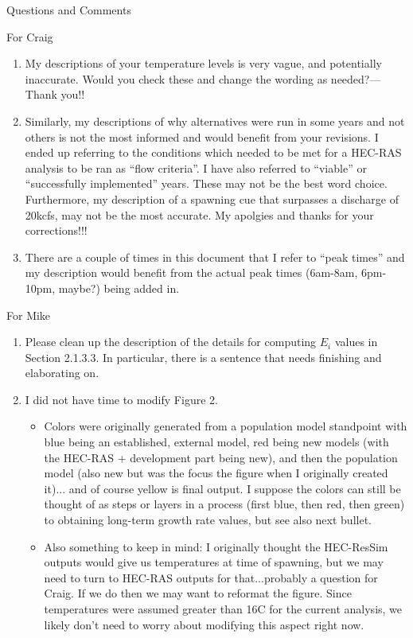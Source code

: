 \documentclass[12pt]{article}
\begin{document}
\begin{section}{Questions and Comments}
\begin{subsection}{For Craig}
\begin{enumerate}
\begin{itemize}
	\end{itemize}
\item My descriptions of your temperature levels is very vague, and potentially inaccurate.  Would you check these and change the wording as needed?---Thank you!!
\item Similarly, my descriptions of why alternatives were run in some years and not others is not the most informed and would benefit from your revisions.  I ended up referring to the conditions which needed to be met for a HEC-RAS analysis to be ran as ``flow criteria''.  I have also referred to ``viable'' or ``successfully implemented'' years.  These may not be the best word choice.  Furthermore, my description of a spawning cue that surpasses a discharge of 20kcfs, may not be the most accurate.  My apolgies and thanks for your corrections!!!
\item There are a couple of times in this document that I refer to ``peak times'' and my description would benefit from the actual peak times (6am-8am, 6pm-10pm, maybe?) being added in.
\end{enumerate}
\end{subsection}
\begin{subsection}{For Mike}
\begin{enumerate}
\item Please clean up the description of the details for computing $E_i$ values in Section 2.1.3.3.  In particular, there is a sentence that needs finishing and elaborating on.
\item I did not have time to modify Figure 2.  
	\begin{itemize} 
	\item Colors were originally generated from a population model standpoint with blue being an established, external model, red being new models (with the HEC-RAS + development part being new), and then the population model (also new but was the focus the figure when I originally created it)... and of course yellow is final output.  I suppose the colors can still be thought of as steps or layers in a process (first blue, then red, then green) to obtaining long-term growth rate values, but see also next bullet.
	\item Also something to keep in mind:  I originally thought the HEC-ResSim outputs would give us temperatures at time of spawning, but we may need to turn to HEC-RAS outputs for that...probably a question for Craig.  If we do then we may want to reformat the figure.  Since temperatures were assumed greater than 16C for the current analysis, we likely don't need to worry about modifying this aspect right now.

\end{itemize}
\end{enumerate}
\end{subsection}
\end{section}
\end{document}
